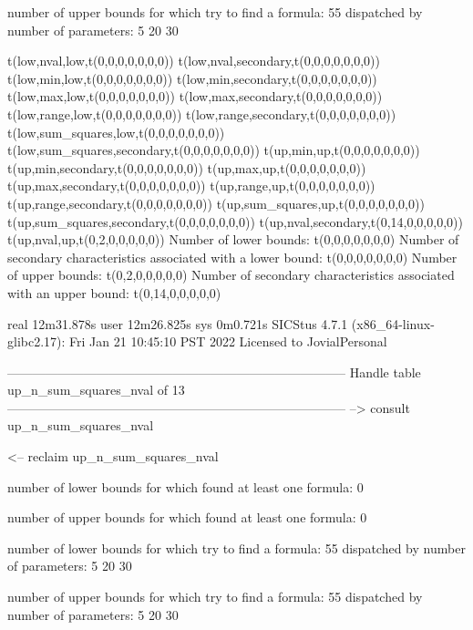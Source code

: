 number of upper bounds for which try to find a formula: 55
dispatched by number of parameters: 5  20  30

t(low,nval,low,t(0,0,0,0,0,0,0))
t(low,nval,secondary,t(0,0,0,0,0,0,0))
t(low,min,low,t(0,0,0,0,0,0,0))
t(low,min,secondary,t(0,0,0,0,0,0,0))
t(low,max,low,t(0,0,0,0,0,0,0))
t(low,max,secondary,t(0,0,0,0,0,0,0))
t(low,range,low,t(0,0,0,0,0,0,0))
t(low,range,secondary,t(0,0,0,0,0,0,0))
t(low,sum_squares,low,t(0,0,0,0,0,0,0))
t(low,sum_squares,secondary,t(0,0,0,0,0,0,0))
t(up,min,up,t(0,0,0,0,0,0,0))
t(up,min,secondary,t(0,0,0,0,0,0,0))
t(up,max,up,t(0,0,0,0,0,0,0))
t(up,max,secondary,t(0,0,0,0,0,0,0))
t(up,range,up,t(0,0,0,0,0,0,0))
t(up,range,secondary,t(0,0,0,0,0,0,0))
t(up,sum_squares,up,t(0,0,0,0,0,0,0))
t(up,sum_squares,secondary,t(0,0,0,0,0,0,0))
t(up,nval,secondary,t(0,14,0,0,0,0,0))
t(up,nval,up,t(0,2,0,0,0,0,0))
Number of lower bounds:                                             t(0,0,0,0,0,0,0)
Number of secondary characteristics associated with a lower bound:  t(0,0,0,0,0,0,0)
Number of upper bounds:                                             t(0,2,0,0,0,0,0)
Number of secondary characteristics associated with an upper bound: t(0,14,0,0,0,0,0)

real	12m31.878s
user	12m26.825s
sys	0m0.721s
SICStus 4.7.1 (x86_64-linux-glibc2.17): Fri Jan 21 10:45:10 PST 2022
Licensed to JovialPersonal


--------------------------------------------------------------------------------
Handle table up_n_sum_squares_nval of 13
--------------------------------------------------------------------------------
--> consult up_n_sum_squares_nval

<-- reclaim up_n_sum_squares_nval

number of lower bounds for which found at least one formula: 0

number of upper bounds for which found at least one formula: 0

number of lower bounds for which try to find a formula: 55
dispatched by number of parameters: 5  20  30

number of upper bounds for which try to find a formula: 55
dispatched by number of parameters: 5  20  30

